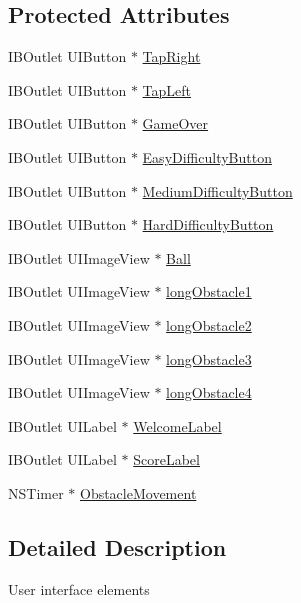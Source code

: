 \subsection*{Protected Attributes}
\begin{DoxyCompactItemize}
\item 
I\+B\+Outlet U\+I\+Button $\ast$ \hyperlink{interface_game_abf35f63e020058662153b0ae30bbd0ee}{Tap\+Right}
\item 
I\+B\+Outlet U\+I\+Button $\ast$ \hyperlink{interface_game_a7f62328175e8d51677326d5790543944}{Tap\+Left}
\item 
I\+B\+Outlet U\+I\+Button $\ast$ \hyperlink{interface_game_a78210082a1410aee42773e4fb591be43}{Game\+Over}
\item 
I\+B\+Outlet U\+I\+Button $\ast$ \hyperlink{interface_game_a26ba198ea2f0a414b0b95360d1400d36}{Easy\+Difficulty\+Button}
\item 
I\+B\+Outlet U\+I\+Button $\ast$ \hyperlink{interface_game_a531920162f2cb866f3aa0af3ac5b292a}{Medium\+Difficulty\+Button}
\item 
I\+B\+Outlet U\+I\+Button $\ast$ \hyperlink{interface_game_add112e180082fe43d77188c8ce3d5218}{Hard\+Difficulty\+Button}
\item 
I\+B\+Outlet U\+I\+Image\+View $\ast$ \hyperlink{interface_game_a282a10964839757856349b7a4eabbb34}{Ball}
\item 
I\+B\+Outlet U\+I\+Image\+View $\ast$ \hyperlink{interface_game_a582f50e63c4d479a078f5f62177a2ecd}{long\+Obstacle1}
\item 
I\+B\+Outlet U\+I\+Image\+View $\ast$ \hyperlink{interface_game_a2c059f04ead15fccf161df8195e7ff19}{long\+Obstacle2}
\item 
I\+B\+Outlet U\+I\+Image\+View $\ast$ \hyperlink{interface_game_a866b9db5bc7955323e159a18bca2be12}{long\+Obstacle3}
\item 
I\+B\+Outlet U\+I\+Image\+View $\ast$ \hyperlink{interface_game_a2c33a254eedcc63d59745221cf2afbf4}{long\+Obstacle4}
\item 
I\+B\+Outlet U\+I\+Label $\ast$ \hyperlink{interface_game_a4f64d94a9c2c7d4647b08f4829b8e76f}{Welcome\+Label}
\item 
I\+B\+Outlet U\+I\+Label $\ast$ \hyperlink{interface_game_a59bd4bbbc65dae70048c54c2a88b38cc}{Score\+Label}
\item 
N\+S\+Timer $\ast$ \hyperlink{interface_game_a50db6bb0df163dfb0778bcf0336324fe}{Obstacle\+Movement}
\end{DoxyCompactItemize}


\subsection{Detailed Description}
User interface elements 

